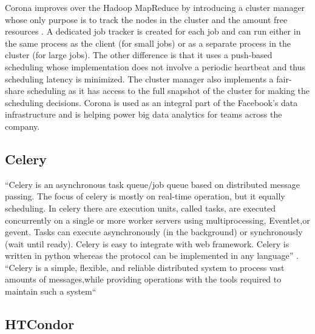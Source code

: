      Corona improves over the Hadoop MapReduce by introducing a
     cluster manager whose only purpose is to track the nodes in the
     cluster and the amount free resources
     \cite{www-facebook-corona}. A dedicated job tracker is created
     for each job and can run either in the same process as the
     client (for small jobs) or as a separate process in the cluster
     (for large jobs). The other difference is that it uses a
     push-based scheduling whose implementation does not involve a
     periodic heartbeat and thus scheduling latency is minimized. The
     cluster manager also implements a fair-share scheduling as it has
     access to the full snapshot of the cluster for making the
     scheduling decisions. Corona is used as an integral part of the
     Facebook's data infrastructure and is helping power big data
     analytics for teams across the company.
     
\subsection{ Celery}

     ``Celery is an asynchronous task queue/job queue based on
     distributed message passing.  The focus of celery is mostly on
     real-time operation, but it equally scheduling.  In celery there
     are execution units, called tasks, are executed concurrently on a
     single or more worker servers using multiprocessing, Eventlet,or
     gevent.  Tasks can execute asynchronously (in the background) or
     synchronously (wait until ready).  Celery is easy to integrate
     with web framework. Celery is written in python whereas the
     protocol can be implemented in any language'' \cite{celery}. ``Celery
     is a simple, flexible, and reliable distributed system to process
     vast amounts of messages,while providing operations with the
     tools required to maintain such a system``\cite{celerydocs}

     
\subsection{ HTCondor}

